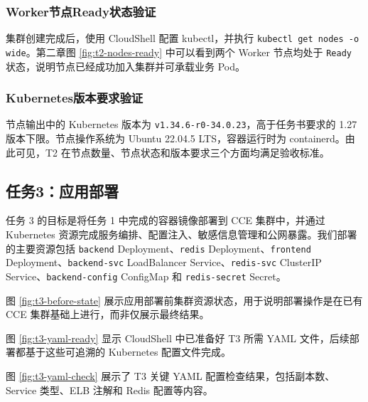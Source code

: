 \subsubsection{Worker节点Ready状态验证}

集群创建完成后，使用 CloudShell 配置 kubectl，并执行 \verb|kubectl get nodes -o wide|。第二章图 \ref{fig:t2-nodes-ready} 中可以看到两个 Worker 节点均处于 \verb|Ready| 状态，说明节点已经成功加入集群并可承载业务 Pod。

\subsubsection{Kubernetes版本要求验证}

节点输出中的 Kubernetes 版本为 \verb|v1.34.6-r0-34.0.23|，高于任务书要求的 1.27 版本下限。节点操作系统为 Ubuntu 22.04.5 LTS，容器运行时为 containerd。由此可见，T2 在节点数量、节点状态和版本要求三个方面均满足验收标准。

\subsection{任务3：应用部署}

任务 3 的目标是将任务 1 中完成的容器镜像部署到 CCE 集群中，并通过 Kubernetes 资源完成服务编排、配置注入、敏感信息管理和公网暴露。我们部署的主要资源包括 \verb|backend| Deployment、\verb|redis| Deployment、\verb|frontend| Deployment、\verb|backend-svc| LoadBalancer Service、\verb|redis-svc| ClusterIP Service、\verb|backend-config| ConfigMap 和 \verb|redis-secret| Secret。


图 \ref{fig:t3-before-state} 展示应用部署前集群资源状态，用于说明部署操作是在已有 CCE 集群基础上进行，而非仅展示最终结果。


图 \ref{fig:t3-yaml-ready} 显示 CloudShell 中已准备好 T3 所需 YAML 文件，后续部署都基于这些可追溯的 Kubernetes 配置文件完成。


图 \ref{fig:t3-yaml-check} 展示了 T3 关键 YAML 配置检查结果，包括副本数、Service 类型、ELB 注解和 Redis 配置等内容。



